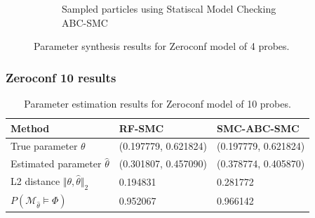 \documentclass{beamer}
\begin{document}
\begin{frame}
\begin{figure}[H]
\begin{subfigure}{0.48\textwidth}
            \caption{Sampled particles using Statiscal Model Checking ABC-SMC}
        \end{subfigure}
        \caption{Parameter synthesis results for Zeroconf model of 4 probes.}
    \end{figure}
\end{frame}




\begin{frame}
    \frametitle{Zeroconf 10 results}
    \footnotesize{
        \begin{table}[H]
            \begin{tabular}{|l|l|l|}
                \hline
                Method                                           & RF-SMC               & SMC-ABC-SMC          \\ \hline
                True parameter $\theta$                          & (0.197779, 0.621824) & (0.197779, 0.621824) \\ \hline
                Estimated parameter $\hat{\theta}$               & (0.301807, 0.457090) & (0.378774, 0.405870) \\ \hline
                L2 distance $\Vert \theta, \hat{\theta} \Vert_2$ & 0.194831             & 0.281772             \\ \hline
                $P(\mathcal{M}_{\hat{\theta}}\models\Phi)$       & 0.952067             & 0.966142             \\ \hline
            \end{tabular}
            \caption{Parameter estimation results for Zeroconf model of 10 probes.}
        \end{table}
    }
\end{frame}
\end{document}
